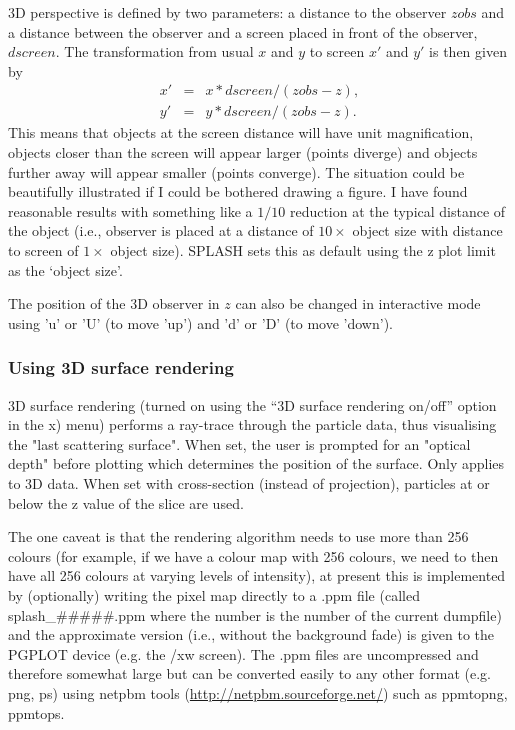 \documentclass[a4paper,10pt]{article}
\newcommand{\splash}{\textsc{SPLASH }}
\begin{document}
  3D perspective is defined by two parameters: a distance to the observer $zobs$ and a distance between the observer and a screen placed in front of the observer, $dscreen$.
The transformation from usual $x$ and $y$ to screen $x'$ and $y'$ is then given by
\begin{eqnarray}
x' & = & x*dscreen/(zobs-z), \nonumber \\
y' & = & y*dscreen/(zobs-z).
\end{eqnarray}
 This means that objects at the screen distance will have unit magnification, objects closer than the
screen will appear larger (points diverge) and objects further away will appear smaller (points
converge). The situation could be beautifully illustrated if I could be bothered drawing a figure. I have found reasonable results with something like a $1/10$ reduction at the typical distance of the object (i.e., observer is placed at a distance of $10\times$ object size with distance to screen of $1\times$ object size). \splash sets this as default using the z plot limit as the `object size'.

 The position of the 3D observer in $z$ can also be changed in interactive mode using 'u' or 'U' (to move 'up') and 'd' or 'D' (to move 'down'). 

\subsubsection{ Using 3D surface rendering}
 3D surface rendering (turned on using the ``3D surface rendering on/off'' option in the x) menu) performs a ray-trace through the particle data, thus visualising the "last scattering surface". When set, the user is prompted for an "optical depth" before plotting which determines the position of the surface. Only applies to 3D data. When set with cross-section (instead of projection), particles at or below the z value of the slice are used.

The one caveat is that the rendering algorithm needs to use more than 256 colours (for example, if we have a colour map with 256 colours, we need to then have all 256 colours at varying levels of intensity), at present this is implemented by
(optionally) writing the pixel map directly to a .ppm file (called splash\_\#\#\#\#\#.ppm where the number is the number of the current dumpfile) and the approximate version (i.e., without the background fade)
is given to the PGPLOT device (e.g. the /xw screen). The .ppm files are uncompressed and therefore somewhat large but can be converted easily to any
other format (e.g. png, ps) using netpbm tools (\url{http://netpbm.sourceforge.net/}) such as
ppmtopng, ppmtops.
\end{document}
